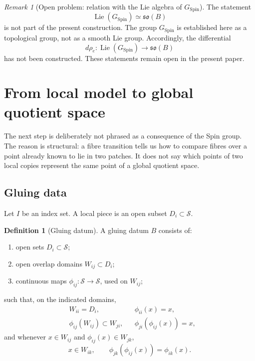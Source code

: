 \documentclass[11pt,a4paper]{article}
\theoremstyle{definition}
\newtheorem{definition}[theorem]{Definition}
\theoremstyle{remark}
\newtheorem{remark}[theorem]{Remark}
\newcommand{\Smodel}{\mathcal{S}}
\newcommand{\SpinG}{G_{\mathrm{Spin}}}
\newcommand{\soB}{\mathfrak{so}(B)}
\begin{document}
\begin{remark}[Open problem: relation with the Lie algebra of \(\SpinG\)]
\label{bdry:lie-spin}
The statement
\[
   \operatorname{Lie}(\SpinG)\simeq\soB
\tag{4.7}
\]
is not part of the present construction.  The group \(\SpinG\) is
established here as a topological group, not as a smooth Lie group.
Accordingly, the differential
\[
   d\rho_{e}:\operatorname{Lie}(\SpinG)
   \longrightarrow\soB
\tag{4.8}
\]
has not been constructed.  These statements remain open in the present paper.
\end{remark}

\clearpage
\section{From local model to global quotient space}
\label{sec:globalization}

The next step is deliberately not phrased as a consequence of the Spin
group.  The reason is structural: a fibre transition tells us how to
compare fibres over a point already known to lie in two patches.  It does
not say which points of two local copies represent the same point of a
global quotient space.

\subsection{Gluing data}

Let \(I\) be an index set.  A local piece is an open subset
\(D_i\subset\Smodel\).

\begin{definition}[Gluing datum]
\label{def:basegluing}
A gluing datum \(B\) consists of:
\begin{enumerate}
\item open sets \(D_i\subset\Smodel\);
\item open overlap domains \(W_{ij}\subset D_i\);
\item continuous maps
      \(\phi_{ij}:\Smodel\to\Smodel\), used on \(W_{ij}\);
\end{enumerate}
such that, on the indicated domains,
\[
\begin{aligned}
   &W_{ii}=D_i,
   &&\phi_{ii}(x)=x,\\
   &\phi_{ij}(W_{ij})\subset W_{ji},
   &&\phi_{ji}(\phi_{ij}(x))=x,
\end{aligned}
\tag{5.1}
\]
and whenever \(x\in W_{ij}\) and
\(\phi_{ij}(x)\in W_{jk}\),
\[
   x\in W_{ik},
   \qquad
   \phi_{jk}(\phi_{ij}(x))=\phi_{ik}(x).
\tag{5.2}
\]
\end{definition}
\end{document}
